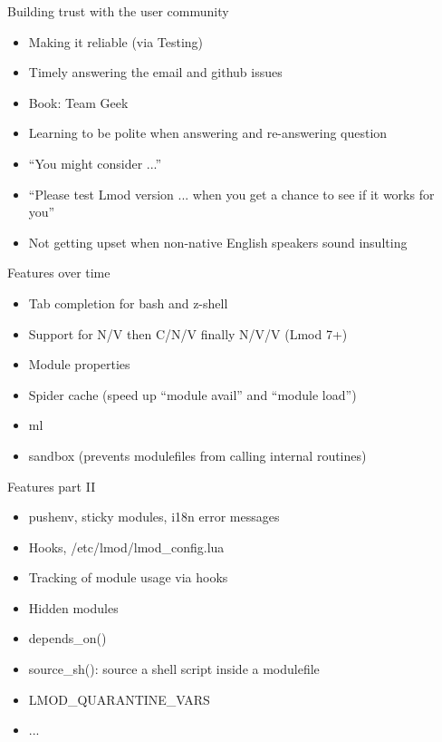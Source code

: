\documentclass{beamer}
\begin{document}
\begin{frame}{Building trust with the user community}
  \begin{itemize}
    \item Making it reliable (via Testing)
    \item Timely answering the email and github issues 
    \item Book: Team Geek
    \item Learning to be polite when answering and re-answering
      question
    \item ``You might consider ...''
    \item ``Please test Lmod version ... when you get a chance to see
      if it works for you''
    \item Not getting upset when non-native English speakers sound
      insulting
  \end{itemize}
\end{frame}

\begin{frame}{Features over time}
  \begin{itemize}
    \item Tab completion for bash and z-shell
    \item Support for N/V then C/N/V finally N/V/V (Lmod 7+)
    \item Module properties
    \item Spider cache (speed up ``module avail'' and ``module load'')
    \item ml
    \item sandbox (prevents modulefiles from calling internal routines)
  \end{itemize}
\end{frame}

\begin{frame}{Features part II}
  \begin{itemize}
    \item pushenv, sticky modules, i18n error messages
    \item Hooks, /etc/lmod/lmod\_config.lua
    \item Tracking of module usage via hooks
    \item Hidden modules
    \item depends\_on()
    \item source\_sh(): source a shell script inside a modulefile
    \item LMOD\_QUARANTINE\_VARS
    \item ...
  \end{itemize}
\end{frame}
\end{document}
